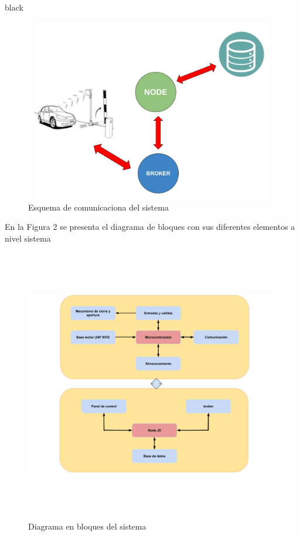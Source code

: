 \documentclass[
11pt, %
codirector, %
]{charter}
\begin{document}
\begin{consigna}{black}
\begin{figure}[htpb]
\centering 
\includegraphics[width=12cm, height=8cm]{./Figuras/ESQ.jpg}
\caption{Esquema de comunicaciona del sistema}
\label{fig:diagBloques}
\end{figure}

\vspace{25px}

En la Figura 2 se presenta el diagrama de bloques con sus diferentes elementos a nivel sistema  
\begin{figure}[htpb]
\centering 
\includegraphics[width=15cm, height=12cm]{./Figuras/DIAGBLOQ.jpg}
\caption{Diagrama en bloques del sistema}
\label{fig:diagBloques}
\end{figure}
\end{consigna}
\end{document}
